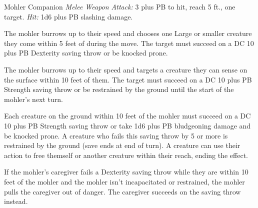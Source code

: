 \documentclass[10pt,a4paper,twoside,bg=print,twocolumn,openany,nodeprecatedcode]{dndbook}
\begin{document}
\begin{DndMonster}[float=t]{Mohler Companion}
\DndMonsterBasics[
armor-class = {13 plus PB (natural armor)},
hit-points = {\DndDice{7 + seven times caregiver's level (number of d8 Hit Dice equal to their caregiver's level)}},
speed = {20 ft., burrow 40 ft.}
]
\DndMonsterAbilityScores[
 str = 7,
 dex = 16,
 con = 14,
 int = 2,
 wis = 12,
 cha = 5
]
\DndMonsterDetails[
saving-throws = {Dex +3 plus PB, Con +2 plus PB},
skills = {Acrobatics +3 plus PB, Stealth +3 plus PB},
senses = {blindsight 20 ft., tremorsense 40 ft., passive perception 11},
]
\textsl{Melee Weapon Attack:} 3 plus PB to hit, reach 5 ft., one target. \textsl{Hit:} 1d6 plus PB slashing damage.

The mohler burrows up to their speed and chooses one Large or smaller creature they come within 5 feet of during the move. The target must succeed on a DC 10 plus PB Dexterity saving throw or be knocked prone.

The mohler burrows up to their speed and targets a creature they can sense on the surface within 10 feet of them. The target must succeed on a DC 10 plus PB Strength saving throw or be restrained by the ground until the start of the mohler's next turn.

Each creature on the ground within 10 feet of the mohler must succeed on a DC 10 plus PB Strength saving throw or take 1d6 plus PB bludgeoning damage and be knocked prone. A creature who fails this saving throw by 5 or more is restrained by the ground (save ends at end of turn). A creature can use their action to free themself or another creature within their reach, ending the effect.

If the mohler's caregiver fails a Dexterity saving throw while they are within 10 feet of the mohler and the mohler isn't incapacitated or restrained, the mohler pulls the caregiver out of danger. The caregiver succeeds on the saving throw instead.

\end{DndMonster}
\end{document}
